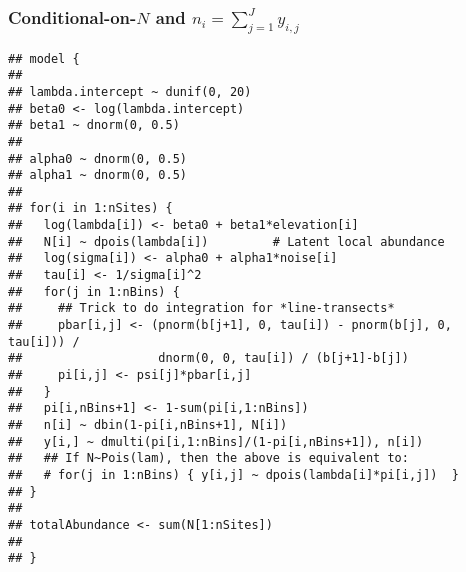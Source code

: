 \documentclass[color=usenames,dvipsnames]{beamer}\usepackage[]{graphicx}\usepackage[]{color}
\makeatletter
\newenvironment{kframe}{%
 \def\at@end@of@kframe{}%
 \ifinner\ifhmode%
  \def\at@end@of@kframe{\end{minipage}}%
  \begin{minipage}{\columnwidth}%
 \fi\fi%
 \def\FrameCommand##1{\hskip\@totalleftmargin \hskip-\fboxsep
 \colorbox{shadecolor}{##1}\hskip-\fboxsep
     \hskip-\linewidth \hskip-\@totalleftmargin \hskip\columnwidth}%
 \MakeFramed {\advance\hsize-\width
   \@totalleftmargin\z@ \linewidth\hsize
   \@setminipage}}%
 {\par\unskip\endMakeFramed%
 \at@end@of@kframe}
\newenvironment{knitrout}{}{} %
\makeatother
\begin{document}
\begin{frame}[fragile]
  \frametitle{\normalsize Conditional-on-$N$ and $n_i=\sum_{j=1}^{J} y_{i,j}$}
\vspace{-3pt}
\begin{knitrout}\tiny
{}\color{fgcolor}\begin{kframe}
\begin{verbatim}
## model {
## 
## lambda.intercept ~ dunif(0, 20)
## beta0 <- log(lambda.intercept)
## beta1 ~ dnorm(0, 0.5)
## 
## alpha0 ~ dnorm(0, 0.5)
## alpha1 ~ dnorm(0, 0.5)
## 
## for(i in 1:nSites) {
##   log(lambda[i]) <- beta0 + beta1*elevation[i]
##   N[i] ~ dpois(lambda[i])         # Latent local abundance
##   log(sigma[i]) <- alpha0 + alpha1*noise[i]
##   tau[i] <- 1/sigma[i]^2
##   for(j in 1:nBins) {
##     ## Trick to do integration for *line-transects*
##     pbar[i,j] <- (pnorm(b[j+1], 0, tau[i]) - pnorm(b[j], 0, tau[i])) /
##                   dnorm(0, 0, tau[i]) / (b[j+1]-b[j])
##     pi[i,j] <- psi[j]*pbar[i,j]
##   }
##   pi[i,nBins+1] <- 1-sum(pi[i,1:nBins])
##   n[i] ~ dbin(1-pi[i,nBins+1], N[i])
##   y[i,] ~ dmulti(pi[i,1:nBins]/(1-pi[i,nBins+1]), n[i])
##   ## If N~Pois(lam), then the above is equivalent to:
##   # for(j in 1:nBins) { y[i,j] ~ dpois(lambda[i]*pi[i,j])  }
## }
## 
## totalAbundance <- sum(N[1:nSites])
## 
## }
\end{verbatim}
\end{kframe}
\end{knitrout}
\end{frame}
\end{document}
